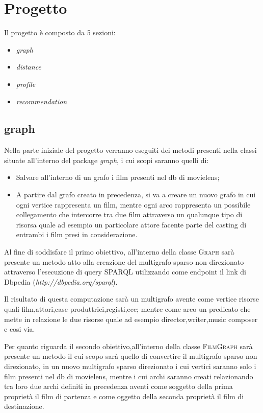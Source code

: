\section{Progetto}
\label{project}

Il progetto è composto da 5 sezioni:
\begin{itemize}
\item\emph{graph}
\item\emph{distance}
\item\emph{profile}
\item\emph{recommendation}
\end{itemize}

\subsection{graph}
Nella parte iniziale del progetto verranno eseguiti dei metodi presenti nella classi situate all'interno del package \emph{graph}, i cui scopi saranno quelli di:
\begin{itemize}
\item Salvare all'interno di un grafo i film presenti nel db di movielens;
\item A partire dal grafo creato in precedenza, si va a creare un nuovo grafo in cui ogni vertice rappresenta un film, mentre ogni arco rappresenta un possibile collegamento che intercorre tra due film attraverso un qualunque tipo di risorsa quale ad esempio un particolare attore facente parte del casting di entrambi i film presi in considerazione.
\end{itemize}

Al fine di soddisfare il primo obiettivo, all'interno della classe \textsc{Graph} sarà presente un metodo atto alla creazione del multigrafo sparso non direzionato attraverso l'esecuzione di query SPARQL utilizzando come endpoint il link di Dbpedia (\textit{http://dbpedia.org/sparql}).

Il risultato di questa computazione sarà un multigrafo avente come vertice risorse quali film,attori,case produttrici,registi,ecc; mentre come arco un predicato che mette in relazione le due risorse quale ad esempio director,writer,music composer e cosi via.

Per quanto riguarda il secondo obiettivo,all'interno della classe \textsc{FilmGraph} sarà presente un metodo il cui scopo sarà quello di convertire il multigrafo sparso non direzionato, in un nuovo multigrafo sparso direzionato i cui vertici saranno solo i film presenti nel db di movielens, mentre i cui archi saranno creati relazionando tra loro due archi definiti in precedenza aventi come soggetto della prima proprietà il film di partenza e come oggetto della seconda proprietà il film di destinazione.

